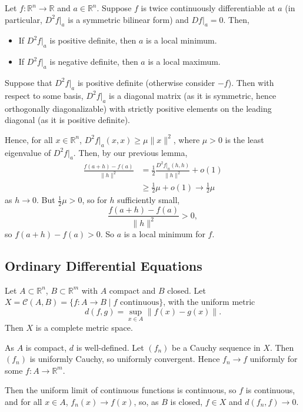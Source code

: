 \documentclass[12pt]{article}
\begin{document}
\begin{theorem}
	Let $f : \mathbb{R}^{n} \to \mathbb{R}$ and $a \in \mathbb{R}^{n}$. Suppose $f$ is twice continuously differentiable at $a$ (in particular, $D^2f|_a$ is a symmetric bilinear form) and $Df|_a = 0$. Then,
	\begin{itemize}
		\item If $D^2f|_a$ is positive definite, then $a$ is a local minimum.
		\item If $D^2f|_a$ is negative definite, then $a$ is a local maximum.
	\end{itemize}
\end{theorem}

\begin{proofbox}
	Suppose that $D^2f|_a$ is positive definite (otherwise consider $-f$). Then with respect to some basis, $D^2f|_a$ is a diagonal matrix (as it is symmetric, hence orthogonally diagonalizable) with strictly positive elements on the leading diagonal (as it is positive definite).

	Hence, for all $x \in \mathbb{R}^{n}$, $D^2f|_a(x, x) \geq \mu \|x\|^2$, where $\mu > 0$ is the least eigenvalue of $D^2f|_a$. Then, by our previous lemma,
	\begin{align*}
		\frac{f(a+h) - f(a)}{\|h\|^2} &= \frac{1}{2} \frac{D^2f|_a(h, h)}{\|h\|^2} + o(1) \\
					      &\geq \frac{1}{2} \mu + o(1) \to \frac{1}{2} \mu
	\end{align*}
	as $h \to 0$. But $\frac{1}{2} \mu > 0$, so for $h$ sufficiently small,
	\[
	\frac{f(a+h) - f(a)}{\|h\|^2} > 0
	,\]
	so $f(a+h) - f(a) > 0$. So $a$ is a local minimum for $f$.
\end{proofbox}

\subsection{Ordinary Differential Equations}
\label{sub:ordinary_differential_equations}

\begin{lemma}
	Let $A \subset \mathbb{R}^{n}$, $B \subset \mathbb{R}^{m}$ with $A$ compact and $B$ closed. Let $X = \mathcal{C}(A, B) = \{f : A \to B \mid f \text{ continuous}\}$, with the uniform metric
	\[
	d(f, g) = \sup_{x \in A}\|f(x) - g(x)\|
	.\]
	Then $X$ is a complete metric space.
\end{lemma}

\begin{proofbox}
	As $A$ is compact, $d$ is well-defined. Let $(f_n)$ be a Cauchy sequence in $X$. Then $(f_n)$ is uniformly Cauchy, so uniformly convergent. Hence $f_n \to f$ uniformly for some $f : A \to \mathbb{R}^{m}$.

	Then the uniform limit of continuous functions is continuous, so $f$ is continuous, and for all $x \in A$, $f_n(x) \to f(x)$, so, as $B$ is closed, $f \in X$ and $d(f_n, f) \to 0$.
\end{proofbox}
\end{document}
